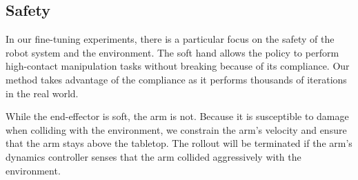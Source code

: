 \subsection{Safety} 

In our fine-tuning experiments, there is a particular focus on the safety of the robot system and the environment. The soft hand allows the policy to perform high-contact manipulation tasks without breaking because of its compliance. Our method takes advantage of the compliance as it performs thousands of iterations in the real world.

While the end-effector is soft, the arm is not. Because it is susceptible to damage when colliding with the environment, we constrain the arm's velocity and ensure that the arm stays above the tabletop. The rollout will be terminated if the arm's dynamics controller senses that the arm collided aggressively with the environment.
 